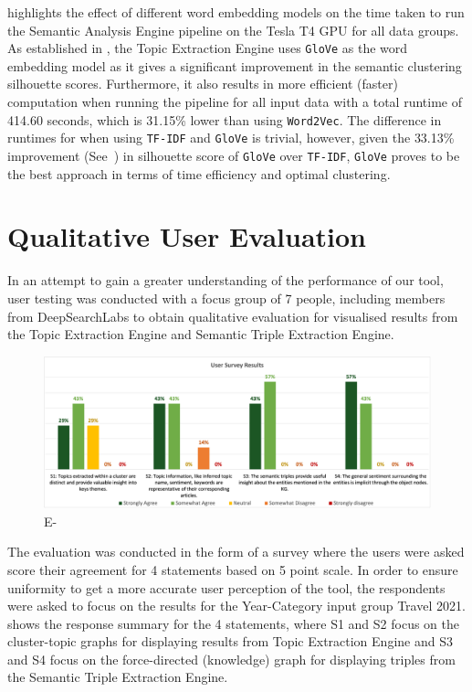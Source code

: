 \vspace{-3ex}
 highlights the effect of different word embedding models on the time taken to run the Semantic Analysis Engine pipeline on the Tesla T4 GPU for all data groups. As established in , the Topic Extraction Engine uses \texttt{GloVe} as the word embedding model as it gives a significant improvement in the semantic clustering silhouette scores. Furthermore, it also results in more efficient (faster) computation when running the pipeline for all input data with a total runtime of 414.60 seconds, which is 31.15\% lower than using \texttt{Word2Vec}. The difference in runtimes for when using \texttt{TF-IDF} and \texttt{GloVe} is trivial, however, given the 33.13\% improvement (See~) in silhouette score of \texttt{GloVe} over \texttt{TF-IDF}, \texttt{GloVe} proves to be the best approach in terms of time efficiency and optimal clustering. 

\section{Qualitative User Evaluation} \label{s:user_eval}
In an attempt to gain a greater understanding of the performance of our tool, user testing was conducted with a focus group of 7 people, including members from DeepSearchLabs to obtain qualitative evaluation for visualised results from the Topic Extraction Engine and Semantic Triple Extraction Engine.

\begin{figure}[H]
\centering     %
\includegraphics[width=0.95\linewidth]{images/eval/user_eval.png}
\caption{E-}
\label{user_eval}
\end{figure}

The evaluation was conducted in the form of a survey where the users were asked score their agreement for 4 statements based on 5 point scale. In order to ensure uniformity to get a more accurate user perception of the tool, the respondents were asked to focus on the results for the Year-Category input group Travel 2021.  shows the response summary for the 4 statements, where S1 and S2 focus on the cluster-topic graphs for displaying results from Topic Extraction Engine and S3 and S4 focus on the force-directed (knowledge) graph for displaying triples from the Semantic Triple Extraction Engine. 

